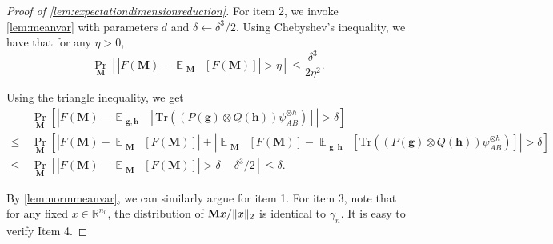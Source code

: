 \documentclass[11pt]{article}
\theoremstyle{plain}
\theoremstyle{definition}
\newcommand {\minusspace} {\: \! \!}
\newcommand {\Fn} [2] {\ensuremath{ #1 \minusspace \Br{ #2 } }}
\newcommand{\reals}{{\mathbb R}}
\newcommand {\br} [1] {\ensuremath{ \left( #1 \right) }}
\newcommand {\Br} [1] {\ensuremath{ \left[ #1 \right] }}
\DeclarePairedDelimiter{\norm}{\lVert}{\rVert}
\newcommand {\ab} [1] {\ensuremath{ \left| #1 \right| }}
\DeclareMathOperator*{\bigE}{\mathbb{E}}
\newcommand {\expec} [2] {\Fn{\bigE_{\substack{#1}}}{#2}}
\newcommand {\Tr} {\ensuremath{ \mathrm{Tr} }}
\newcommand{\randg}{\ensuremath{\mathbf{g}}}
\newcommand{\randh}{\ensuremath{\mathbf{h}}}
\newcommand{\randM}{\ensuremath{\mathbf{M}}}
\newcommand{\1}{\mathbb{1}} %
\begin{document}
\begin{proof}[Proof of \cref{lem:expectationdimensionreduction}]


For item 2, we invoke \cref{lem:meanvar} with parameters $d$ and $\delta\leftarrow\delta^3/2$. 
 Using Chebyshev's inequality, we have that for any $\eta>0$,
\[\Pr_{\mathbf{M}}\Br{\ab{F(\mathbf{M})-\expec{\mathbf{M}}{F(\mathbf{M})}}>\eta}\leq\frac{\delta^3}{2\eta^2}.\]

Using the triangle inequality, we get
\begin{align*}
&\Pr_{\mathbf{M}}\Br{\ab{F(\mathbf{M})-\expec{\mathbf{g},\mathbf{h}}{\Tr\br{\br{P(\randg)\otimes Q(\randh)}\psi_{AB}^{\otimes h}}}}>\delta}\\
\leq~&\Pr_{\mathbf{M}}\Br{\ab{F(\mathbf{M})-\expec{\mathbf{M}}{F(\mathbf{M})}}+\ab{\expec{\mathbf{M}}{F(\mathbf{M})}-\expec{\mathbf{g},\mathbf{h}}{\Tr\br{\br{P(\randg)\otimes Q(\randh)}\psi_{AB}^{\otimes h}}}}>\delta}\\
\leq~&\Pr_{\mathbf{M}}\Br{\ab{F(\mathbf{M})-\expec{\mathbf{M}}{F(\mathbf{M})}}>\delta-\delta^3/2}\leq\delta.
\end{align*}

By \cref{lem:normmeanvar}, we can similarly argue for item 1. For item 3, note that for any fixed $x\in\reals^{n_0}$, the distribution of $\randM x/\norm{x}_2$ is identical to $\gamma_{n}$.
	It is easy to verify Item 4.
\end{proof}
\end{document}
